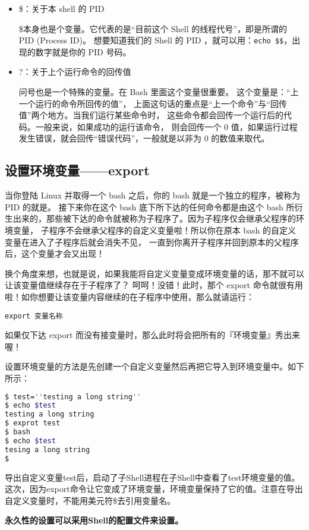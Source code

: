 {\begin{itemize}
\item \$：关于本 shell 的 PID

\qquad \$本身也是个变量。它代表的是“目前这个 Shell 的线程代号”，即是所谓的 PID (Process ID)。 想要知道我们的 Shell 的 PID ，就可以用：\verb|echo $$|，出现的数字就是你的 PID 号码。

\item ?：关于上个运行命令的回传值

\qquad 问号也是一个特殊的变量。在 Bash 里面这个变量很重要。 这个变量是：“上一个运行的命令所回传的值”， 上面这句话的重点是“上一个命令”与“回传值”两个地方。当我们运行某些命令时， 这些命令都会回传一个运行后的代码。一般来说，如果成功的运行该命令， 则会回传一个 0 值，如果运行过程发生错误，就会回传“错误代码”，一般就是以非为 0 的数值来取代。
\end{itemize}



\subsection{设置环境变量——export}
当你登陆 Linux 并取得一个 bash 之后，你的 bash 就是一个独立的程序，被称为 PID 的就是。 接下来你在这个 bash 底下所下达的任何命令都是由这个 bash 所衍生出来的，那些被下达的命令就被称为子程序了。因为子程序仅会继承父程序的环境变量， 子程序不会继承父程序的自定义变量啦！所以你在原本 bash 的自定义变量在进入了子程序后就会消失不见， 一直到你离开子程序并回到原本的父程序后，这个变量才会又出现！

换个角度来想，也就是说，如果我能将自定义变量变成环境变量的话，那不就可以让该变量值继续存在于子程序了？ 呵呵！没错！此时，那个 export 命令就很有用啦！如你想要让该变量内容继续的在子程序中使用，那么就请运行：

\verb|export 变量名称|

 如果仅下达 export 而没有接变量时，那么此时将会把所有的『环境变量』秀出来喔！

设置环境变量的方法是先创建一个自定义变量然后再把它导入到环境变量中。如下所示：
\begin{lstlisting}[language=sh]
$ test=''testing a long string''
$ echo $test
testing a long string
$ exprot test
$ bash
$ echo $test
tesing a long string
$
\end{lstlisting}

导出自定义变量test后，启动了子Shell进程在子Shell中查看了test环境变量的值。这次，因为export命令让它变成了环境变量，环境变量保持了它的值。注意在导出自定义变量时，不能用美元符\$去引用变量名。

\textbf{永久性的设置可以采用Shell的配置文件来设置。}




}

